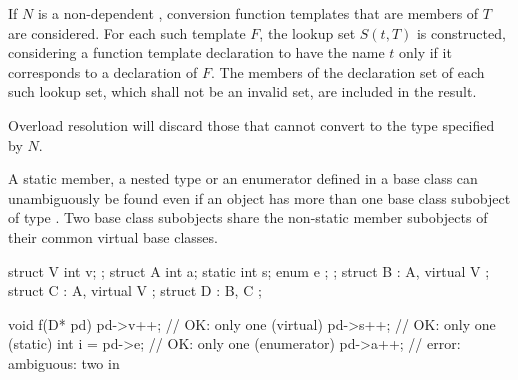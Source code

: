 \pnum
If $N$ is a non-dependent ,
conversion function templates that are members of $T$ are considered.
For each such template $F$, the lookup set $S(t,T)$ is constructed,
considering a function template declaration to have the name $t$
only if it corresponds to a declaration of $F$.
The members of the declaration set of each such lookup set,
which shall not be an invalid set, are included in the result.
\begin{note}
Overload resolution will discard those
that cannot convert to the type specified by $N$.
\end{note}

\pnum
\begin{note}
A static member, a nested type or an enumerator defined in a base class
 can unambiguously be found even if an object has more than one
base class subobject of type . Two base class subobjects share
the non-static member subobjects of their common virtual base classes.
\end{note}
\begin{example}
\begin{codeblock}
struct V {
  int v;
};
struct A {
  int a;
  static int s;
  enum { e };
};
struct B : A, virtual V { };
struct C : A, virtual V { };
struct D : B, C { };

void f(D* pd) {
  pd->v++;          // OK: only one  (virtual)
  pd->s++;          // OK: only one  (static)
  int i = pd->e;    // OK: only one  (enumerator)
  pd->a++;          // error: ambiguous: two  in 
}
\end{codeblock}
\end{example}

